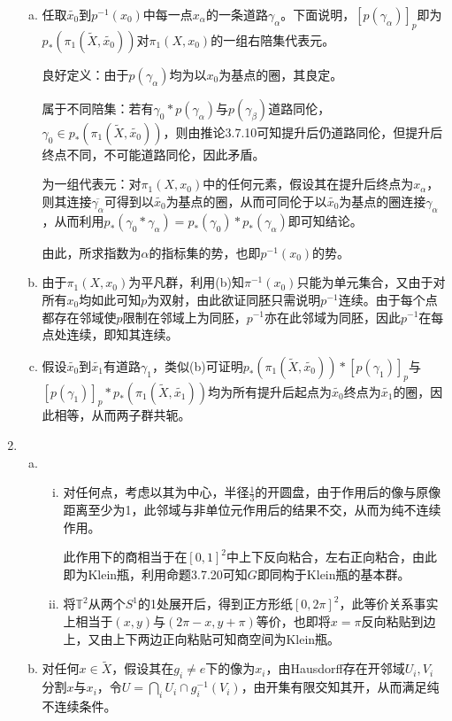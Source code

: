 \documentclass[a4paper,UTF8,fontset=windows]{ctexart}
\begin{document}
\begin{enumerate}[(1)]
\begin{enumerate}[(a)]
    \item
    任取$\tilde{x_0}$到$p^{-1}(x_0)$中每一点$x_\alpha$的一条道路$\gamma_\alpha$。下面说明，$[p(\gamma_\alpha)]_p$即为$p_*(\pi_1(\tilde{X},\tilde{x_0}))$对$\pi_1(X,x_0)$的一组右陪集代表元。
    
    良好定义：由于$p(\gamma_\alpha)$均为以$x_0$为基点的圈，其良定。
    
    属于不同陪集：若有$\gamma_0*p(\gamma_\alpha)$与$p(\gamma_\beta)$道路同伦，$\gamma_0\in p_*(\pi_1(\tilde{X},\tilde{x_0}))$，则由推论3.7.10可知提升后仍道路同伦，但提升后终点不同，不可能道路同伦，因此矛盾。
    
    为一组代表元：对$\pi_1(X,x_0)$中的任何元素，假设其在提升后终点为$x_\alpha$，则其连接$\overline{\gamma_\alpha}$可得到以$\tilde{x_0}$为基点的圈，从而可同伦于以$\tilde{x_0}$为基点的圈连接$\gamma_\alpha$，从而利用$p_*(\gamma_0*\gamma_\alpha)=p_*(\gamma_0)*p_*(\gamma_\alpha)$即可知结论。
    
    由此，所求指数为$\alpha$的指标集的势，也即$p^{-1}(x_0)$的势。
    
    \item
    由于$\pi_1(X,x_0)$为平凡群，利用(b)知$\pi^{-1}(x_0)$只能为单元集合，又由于对所有$x_0$均如此可知$p$为双射，由此欲证同胚只需说明$p^{-1}$连续。由于每个点都存在邻域使$p$限制在邻域上为同胚，$p^{-1}$亦在此邻域为同胚，因此$p^{-1}$在每点处连续，即知其连续。
    
    \item
    假设$\tilde{x_0}$到$\tilde{x_1}$有道路$\gamma_1$，类似(b)可证明$p_*(\pi_1(\tilde{X},\tilde{x_0}))*[p(\gamma_1)]_p$与$[p(\gamma_1)]_p*p_*(\pi_1(\tilde{X},\tilde{x_1}))$均为所有提升后起点为$\tilde{x_0}$终点为$\tilde{x_1}$的圈，因此相等，从而两子群共轭。
    \end{enumerate}
    
    \item
    \begin{enumerate}[(a)]
    \item
    \begin{enumerate}[(i)]
    \item
    对任何点，考虑以其为中心，半径$\frac{1}{3}$的开圆盘，由于作用后的像与原像距离至少为1，此邻域与非单位元作用后的结果不交，从而为纯不连续作用。
    
    此作用下的商相当于在$[0,1]^2$中上下反向粘合，左右正向粘合，由此即为Klein瓶，利用命题3.7.20可知$G$即同构于Klein瓶的基本群。
    
    \item
    将$\mathbb{T}^2$从两个$S^1$的1处展开后，得到正方形纸$[0,2\pi]^2$，此等价关系事实上相当于$(x,y)$与$(2\pi-x,y+\pi)$等价，也即将$x=\pi$反向粘贴到边上，又由上下两边正向粘贴可知商空间为Klein瓶。
    \end{enumerate}
    \item
    对任何$x\in\tilde{X}$，假设其在$g_i\ne e$下的像为$x_i$，由Hausdorff存在开邻域$U_i,V_i$分割$x$与$x_i$，令$U=\bigcap_iU_i\cap g_i^{-1}(V_i)$，由开集有限交知其开，从而满足纯不连续条件。
    

\end{enumerate}
\end{enumerate}
\end{document}

